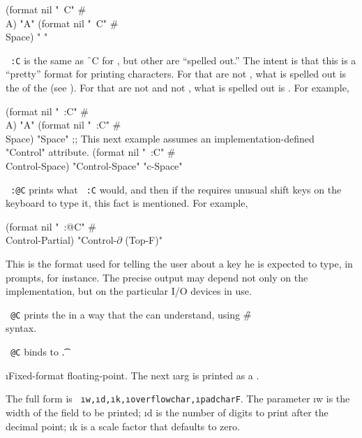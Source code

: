 \code
 (format nil "~C" #\\A) \EV "A"
 (format nil "~C" #\\Space) \EV " "
\endcode
{}

{\tt ~:C} is the same as \f{~C} for  ,
but other  are ``spelled out.''  The intent is that this
is a ``pretty'' format for printing characters.
For   that are not ,
what is spelled out is the  of the  (see ).
For  that are not  and not ,
what is spelled out is .
For example, 

\code
 (format nil "~:C" #\\A) \EV "A"
 (format nil "~:C" #\\Space) \EV "Space"
;; This next example assumes an implementation-defined "Control" attribute.
 (format nil "~:C" #\\Control-Space)
\EV "Control-Space"
\OV "c-Space"
\endcode

{\tt ~:@C} prints what {\tt ~:C} would, and then
if the  requires unusual shift keys on the keyboard to type it,
this fact is mentioned.  For example,

\begingroup
\def\Partial{$\partial$}
\code
 (format nil "~:@C" #\\Control-Partial) \EV "Control-{\Partial} (Top-F)"  
\endcode
\endgroup

This is the format used for telling the user about a key he is expected to type,
in prompts, for instance.  The precise output may depend not only
on the implementation, but on the particular I/O devices in use.
                           
{\tt ~@C} 
prints the  in a way that the  can understand,
using \f{\#\\} syntax.

{\tt ~@C}  binds  to \t.


\i{Fixed-format floating-point}.
The next \i{arg} is printed as a .

The full form is {\tt ~\i{w},\i{d},\i{k},\i{overflowchar},\i{padchar}F}.
The parameter \i{w}
is the width of the field to be printed; \i{d} is the number
of digits to print after the decimal point; \i{k} is a scale factor
that defaults to zero.

